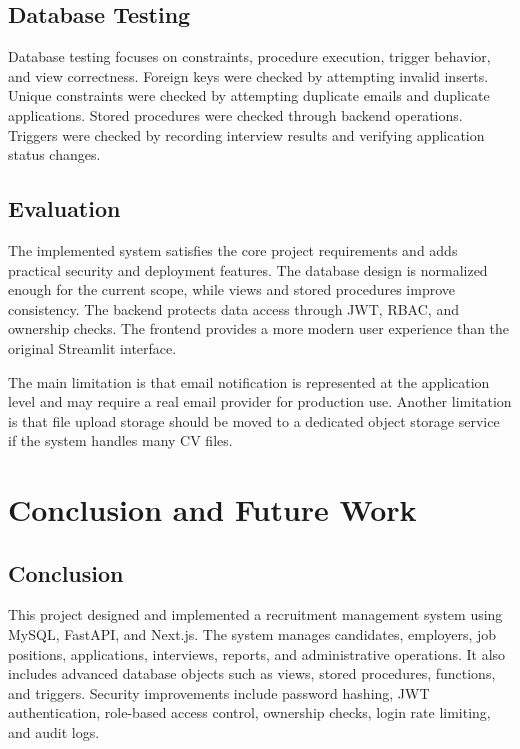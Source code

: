 \documentclass[12pt,a4paper]{report}
\begin{document}
\section{Database Testing}

Database testing focuses on constraints, procedure execution, trigger behavior, and view correctness. Foreign keys were checked by attempting invalid inserts. Unique constraints were checked by attempting duplicate emails and duplicate applications. Stored procedures were checked through backend operations. Triggers were checked by recording interview results and verifying application status changes.

\section{Evaluation}

The implemented system satisfies the core project requirements and adds practical security and deployment features. The database design is normalized enough for the current scope, while views and stored procedures improve consistency. The backend protects data access through JWT, RBAC, and ownership checks. The frontend provides a more modern user experience than the original Streamlit interface.

The main limitation is that email notification is represented at the application level and may require a real email provider for production use. Another limitation is that file upload storage should be moved to a dedicated object storage service if the system handles many CV files.

\chapter{Conclusion and Future Work}

\section{Conclusion}

This project designed and implemented a recruitment management system using MySQL, FastAPI, and Next.js. The system manages candidates, employers, job positions, applications, interviews, reports, and administrative operations. It also includes advanced database objects such as views, stored procedures, functions, and triggers. Security improvements include password hashing, JWT authentication, role-based access control, ownership checks, login rate limiting, and audit logs.
\end{document}
